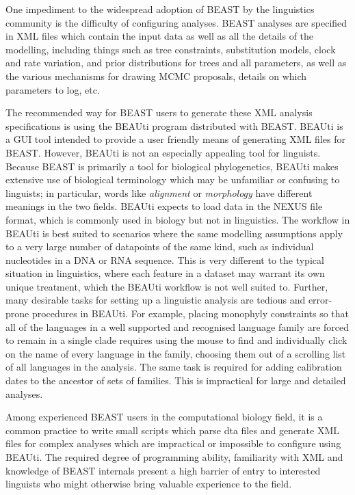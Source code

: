 \documentclass[twocolumn,10pt]{scrartcl}
\begin{document}
One impediment to the widespread adoption of BEAST by the linguistics community is the difficulty of configuring analyses.  BEAST analyses are specified in XML files which contain the input data as well as all the details of the modelling, including things such as tree constraints, substitution models, clock and rate variation,  and prior distributions for trees and all parameters, as well as the various mechanisms for drawing MCMC proposals, details on which parameters to log, etc.

The recommended way for BEAST users to generate these XML analysis specifications is using the BEAUti program distributed with BEAST.  BEAUti is a GUI tool intended to provide a user friendly means of generating XML files for BEAST.  However, BEAUti is not an especially appealing tool for linguists.  Because BEAST is primarily a tool for biological phylogenetics, BEAUti makes extensive use of biological terminology which may be unfamiliar or confusing to linguists; in particular, words like \emph{alignment} or \emph{morphology} have different meanings in the two fields.  BEAUti expects to load data in the NEXUS file format, which is commonly used in biology but not in linguistics.  The workflow in BEAUti is best suited to scenarios where the same modelling assumptions apply to a very large number of datapoints of the same kind, such as individual nucleotides in a DNA or RNA sequence.  This is very different to the typical situation in linguistics, where each feature in a dataset may warrant its own unique treatment, which the BEAUti workflow is not well suited to.  Further, many desirable tasks for setting up a linguistic analysis are tedious and error-prone procedures in BEAUti.  For example, placing monophyly constraints so that all of the languages in a well supported and recognised language family are forced to remain in a single clade requires using the mouse to find and individually click on the name of every language in the family, choosing them out of a scrolling list of all languages in the analysis.  The same task is required for adding calibration dates to the ancestor of sets of families.  This is impractical for large and detailed analyses.

Among experienced BEAST users in the computational biology field, it is a common practice to write small scripts which parse dta files and generate XML files for complex analyses which are impractical or impossible to configure using BEAUti.  The required degree of programming ability, familiarity with XML and knowledge of BEAST internals present a high barrier of entry to interested linguists who might otherwise bring valuable experience to the field.
\end{document}
